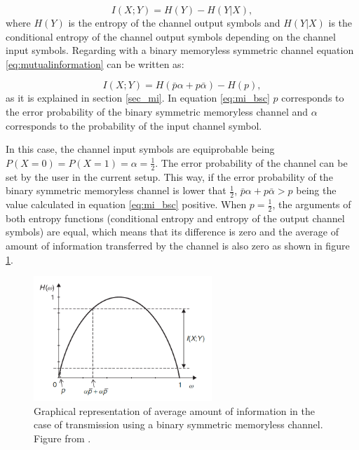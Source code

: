 \begin{refsection}
\begin{equation}\label{eq:mutualinformation}
  I(X;Y) = H(Y) - H(Y|X),
\end{equation}
where $H(Y)$ is the entropy of the channel output symbols and $H(Y|X)$ is the conditional entropy of the channel output symbols depending on the channel input symbols. Regarding with a binary memoryless symmetric channel equation \ref{eq:mutualinformation} can be written as:

\begin{equation}\label{eq:mi_bsc}
  I(X;Y) = H(\bar{p}\alpha + p \bar{\alpha}) - H(p),
\end{equation}
as it is explained in section \ref{sec_mi}. In equation \ref{eq:mi_bsc} $p$ corresponds to the error probability of the binary symmetric memoryless channel and $\alpha$ corresponds to the probability of the input channel symbol.

In this case, the channel input symbols are equiprobable being $P(X=0) = P(X=1) = \alpha = \frac{1}{2}$. The error probability of the channel can be set by the user in the current setup. This way, if the error probability of the binary symmetric memoryless channel is lower that $\frac{1}{2}$, $\bar{p}\alpha + p \bar{\alpha} > p$ being the value calculated in equation \ref{eq:mi_bsc} positive. When $p=\frac{1}{2}$, the arguments of both entropy functions (conditional entropy and entropy of the output channel symbols) are equal, which means that its difference is zero and the average of amount of information transferred by the channel is also zero as shown in figure \ref{mifigure}.

\begin{figure}[H]
	\centering
	\includegraphics[width=0.6\textwidth]{./sdf/eit_87071_mutual_information_estimator/figures/mi_memoryless_binary_symmetric_channel.PNG}
	
	\caption{Graphical representation of average amount of information in the case of transmission using a binary symmetric memoryless channel. Figure from \cite{Wesolowski09}. }\label{mifigure}


\end{figure}
\end{refsection}
